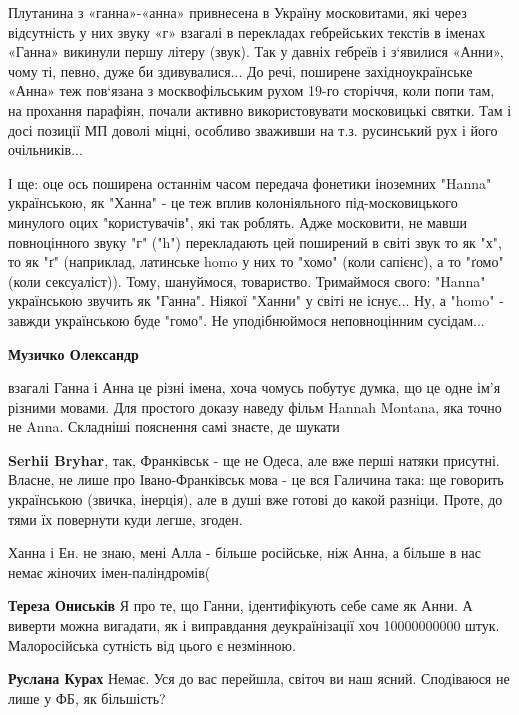 \begin{itemize}
\begin{itemize}
Плутанина з «ганна»-«анна» привнесена в Україну московитами, які через
відсутність у них звуку «г» взагалі в перекладах гебрейських текстів в іменах
«Ганна» викинули першу літеру (звук). Так у давніх гебреїв і з‘явилися «Анни»,
чому ті, певно, дуже би здивувалися... До речі, поширене західноукраїнське
«Анна» теж пов‘язана з москвофільським рухом 19-го сторіччя, коли попи там, на
прохання парафіян, почали активно використовувати московицькі святки. Там і
досі позиції МП доволі міцні, особливо зваживши на т.з. русинський рух і його
очільників...

І ще: оце ось поширена останнім часом передача фонетики іноземних "Hanna"
українською, як "Ханна" - це теж вплив колоніяльного під-московицького минулого
оцих "користувачів", які так роблять. Адже московити, не мавши повноцінного
звуку "г" ("h") перекладають цей поширений в світі звук то як "х", то як "ґ"
(наприклад, латинське homo у них то "хомо" (коли сапієнс), а то "ґомо" (коли
сексуаліст)).  Тому, шануймося, товариство. Тримаймося свого: "Hanna"
українською звучить як "Ганна". Ніякої "Ханни" у світі не існує... Ну, а "homo"
- завжди українською буде "гомо". Не уподібнюймося неповноцінним сусідам...

\textbf{Музичко Олександр} 

взагалі Ганна і Анна це різні імена, хоча чомусь побутує думка, що це одне ім'я
різними мовами. Для простого доказу наведу фільм Hannah Montana, яка точно не
Anna. Складніші пояснення самі знаєте, де шукати

\textbf{Serhii Bryhar}, так, Франківськ - ще не Одеса, але вже перші натяки присутні. Власне, не лише про Івано-Франківськ мова - це вся Галичина така: ще говорить українською (звичка, інерція), але в душі вже готові до какой разніци. Проте, до тями їх повернути куди легше, згоден.

Ханна і Ен. не знаю, мені Алла - більше російське, ніж Анна, а більше в нас немає жіночих імен-паліндромів(

\textbf{Тереза Ониськів} Я про те, що Ганни, ідентифікують себе саме як Анни. А виверти можна вигадати, як і виправдання деукраїнізації хоч 10000000000 штук. Малоросійська сутність від цього є незмінною.

\textbf{Руслана Курах} Немає. Уся до вас перейшла, світоч ви наш ясний. Сподіваюся не лише у ФБ, як більшість?



\end{itemize}
\end{itemize}
